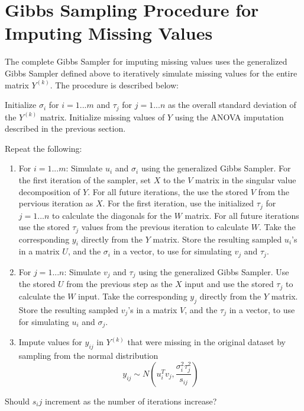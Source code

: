 \documentclass[12pt,twoside]{dukestatscithesis}
\providecommand{\tightlist}{%
  \setlength{\itemsep}{0pt}\setlength{\parskip}{0pt}}
\theoremstyle{definition}
\theoremstyle{definition}
\theoremstyle{definition}
\theoremstyle{remark}
\begin{document}
\section{Gibbs Sampling Procedure for Imputing Missing
Values}\label{gibbs-sampling-procedure-for-imputing-missing-values}

The complete Gibbs Sampler for imputing missing values uses the
generalized Gibbs Sampler defined above to iteratively simulate missing
values for the entire matrix \(Y^{(k)}\). The procedure is described
below:

Initialize \(\sigma_i\) for \(i = 1 ... m\) and \(\tau_j\) for
\(j = 1 ... n\) as the overall standard deviation of the \(Y^{(k)}\)
matrix. Initialize missing values of \(Y\) using the ANOVA imputation
described in the previous section.

Repeat the following:
\begin{enumerate}
\def\labelenumi{\arabic{enumi}.}
\tightlist
\item
  For \(i = 1 ... m\): Simulate \(u_i\) and \(\sigma_i\) using the
  generalized Gibbs Sampler. For the first iteration of the sampler, set
  \(X\) to the \(V\) matrix in the singular value decomposition of
  \(Y\). For all future iterations, the use the stored \(V\) from the
  pervious iteration as \(X\). For the first iteration, use the
  initialized \(\tau_j\) for \(j = 1 ... n\) to calculate the diagonals
  for the \(W\) matrix. For all future iterations use the stored
  \(\tau_j\) values from the previous iteration to calculate \(W\). Take
  the corresponding \(y_i\) directly from the \(Y\) matrix. Store the
  resulting sampled \(u_i\)'s in a matrix \(U\), and the \(\sigma_i\) in
  a vector, to use for simulating \(v_j\) and \(\tau_j\).
\item
  For \(j = 1 ... n\): Simulate \(v_j\) and \(\tau_j\) using the
  generalized Gibbs Sampler. Use the stored \(U\) from the previous step
  as the \(X\) input and use the stored \(\tau_j\) to calculate the
  \(W\) input. Take the corresponding \(y_j\) directly from the \(Y\)
  matrix. Store the resulting sampled \(v_j\)'s in a matrix \(V\), and
  the \(\tau_j\) in a vector, to use for simulating \(u_i\) and
  \(\sigma_j\).
\item
  Impute values for \(y_{ij}\) in \(Y^{(k)}\) that were missing in the
  original dataset by sampling from the normal distribution
  \[y_{ij} \sim N(u_i^Tv_j, \frac{\sigma_i^2\tau_j^2}{s_{ij}})\]
\end{enumerate}
Should \(s_ij\) increment as the number of iterations increase?
\end{document}
